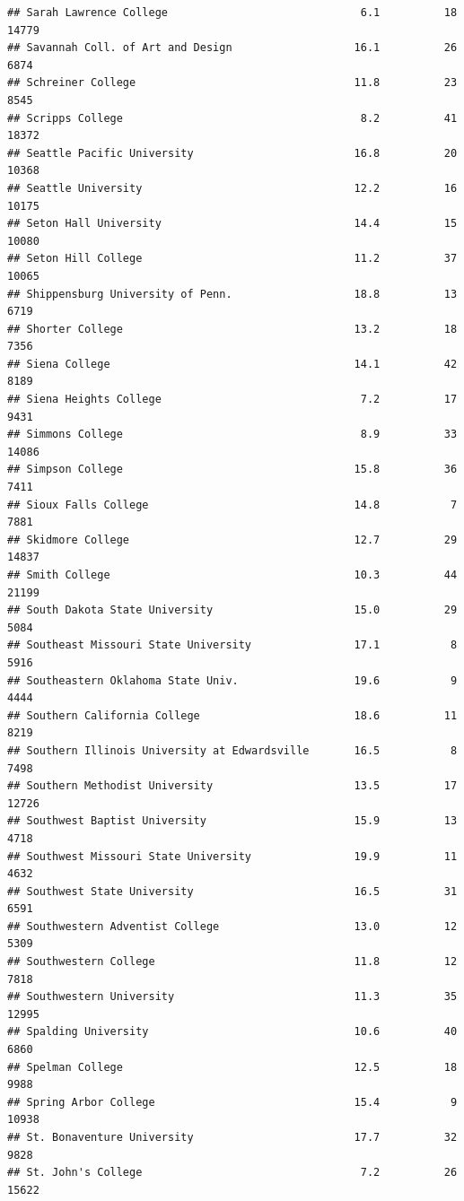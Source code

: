 \documentclass[
]{article}
\begin{document}
\begin{verbatim}
## Sarah Lawrence College                              6.1          18  14779
## Savannah Coll. of Art and Design                   16.1          26   6874
## Schreiner College                                  11.8          23   8545
## Scripps College                                     8.2          41  18372
## Seattle Pacific University                         16.8          20  10368
## Seattle University                                 12.2          16  10175
## Seton Hall University                              14.4          15  10080
## Seton Hill College                                 11.2          37  10065
## Shippensburg University of Penn.                   18.8          13   6719
## Shorter College                                    13.2          18   7356
## Siena College                                      14.1          42   8189
## Siena Heights College                               7.2          17   9431
## Simmons College                                     8.9          33  14086
## Simpson College                                    15.8          36   7411
## Sioux Falls College                                14.8           7   7881
## Skidmore College                                   12.7          29  14837
## Smith College                                      10.3          44  21199
## South Dakota State University                      15.0          29   5084
## Southeast Missouri State University                17.1           8   5916
## Southeastern Oklahoma State Univ.                  19.6           9   4444
## Southern California College                        18.6          11   8219
## Southern Illinois University at Edwardsville       16.5           8   7498
## Southern Methodist University                      13.5          17  12726
## Southwest Baptist University                       15.9          13   4718
## Southwest Missouri State University                19.9          11   4632
## Southwest State University                         16.5          31   6591
## Southwestern Adventist College                     13.0          12   5309
## Southwestern College                               11.8          12   7818
## Southwestern University                            11.3          35  12995
## Spalding University                                10.6          40   6860
## Spelman College                                    12.5          18   9988
## Spring Arbor College                               15.4           9  10938
## St. Bonaventure University                         17.7          32   9828
## St. John's College                                  7.2          26  15622

\end{verbatim}
\end{document}
